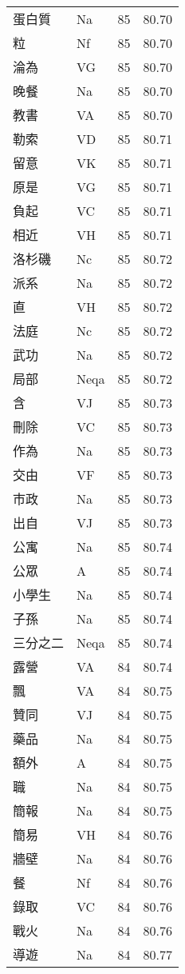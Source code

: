 \documentclass[twocolumn]{book}
\begin{document}
\begin{supertabular}{llrr}
蛋白質 & Na & 85 &  80.70\\
粒 & Nf & 85 &  80.70\\
淪為 & VG & 85 &  80.70\\
晚餐 & Na & 85 &  80.70\\
教書 & VA & 85 &  80.70\\
勒索 & VD & 85 &  80.71\\
留意 & VK & 85 &  80.71\\
原是 & VG & 85 &  80.71\\
負起 & VC & 85 &  80.71\\
相近 & VH & 85 &  80.71\\
洛杉磯 & Nc & 85 &  80.72\\
派系 & Na & 85 &  80.72\\
直 & VH & 85 &  80.72\\
法庭 & Nc & 85 &  80.72\\
武功 & Na & 85 &  80.72\\
局部 & Neqa & 85 &  80.72\\
含 & VJ & 85 &  80.73\\
刪除 & VC & 85 &  80.73\\
作為 & Na & 85 &  80.73\\
交由 & VF & 85 &  80.73\\
市政 & Na & 85 &  80.73\\
出自 & VJ & 85 &  80.73\\
公寓 & Na & 85 &  80.74\\
公眾 & A & 85 &  80.74\\
小學生 & Na & 85 &  80.74\\
子孫 & Na & 85 &  80.74\\
三分之二 & Neqa & 85 &  80.74\\
露營 & VA & 84 &  80.74\\
飄 & VA & 84 &  80.75\\
贊同 & VJ & 84 &  80.75\\
藥品 & Na & 84 &  80.75\\
額外 & A & 84 &  80.75\\
職 & Na & 84 &  80.75\\
簡報 & Na & 84 &  80.75\\
簡易 & VH & 84 &  80.76\\
牆壁 & Na & 84 &  80.76\\
餐 & Nf & 84 &  80.76\\
錄取 & VC & 84 &  80.76\\
戰火 & Na & 84 &  80.76\\
導遊 & Na & 84 &  80.77\\

\end{supertabular}
\end{document}
